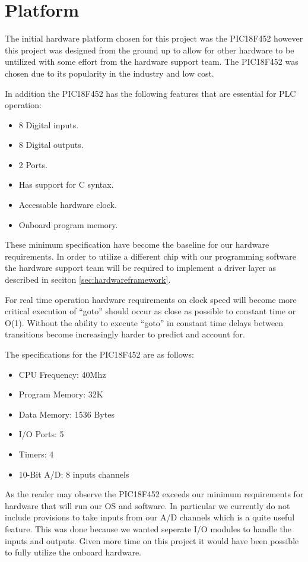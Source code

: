 \section{Platform}
\label{sec:hardwareplatform}

The initial hardware platform chosen for this project was the PIC18F452 however this project was designed from the ground up to allow for other hardware to be untilized with some effort from the hardware support team. The PIC18F452 was chosen due to its popularity in the industry and low cost.

In addition the PIC18F452 has the following features that are essential for PLC operation:

\begin{itemize}
\item 8 Digital inputs.
\item 8 Digital outputs.
\item 2 Ports.
\item Has support for C syntax.
\item Accessable hardware clock.
\item Onboard program memory.
\end{itemize}

These minimum specification have become the baseline for our hardware requirements. In order to utilize a different chip with our programming software the hardware support team will be required to implement a driver layer as described in seciton \ref{sec:hardwareframework}.

For real time operation hardware requirements on clock speed will become more critical execution of ``goto'' should occur as close as possible to constant time or O(1). Without the ability to execute ``goto'' in constant time delays between transitions become increasingly harder to predict and account for.

The specifications for the PIC18F452 are as follows:
\begin{itemize}
	\item CPU Frequency: 40Mhz
	\item Program Memory: 32K
	\item Data Memory: 1536 Bytes
	\item I/O Ports: 5
	\item Timers: 4
	\item 10-Bit A/D: 8 inputs channels
\end{itemize}

As the reader may observe the PIC18F452 exceeds our minimum requirements for hardware that will run our OS and software. In particular we currently do not include provisions to take inputs from our A/D channels which is a quite useful feature. This was done because we wanted seperate I/O modules to handle the inputs and outputs. Given more time on this project it would have been possible to fully utilize the onboard hardware.
